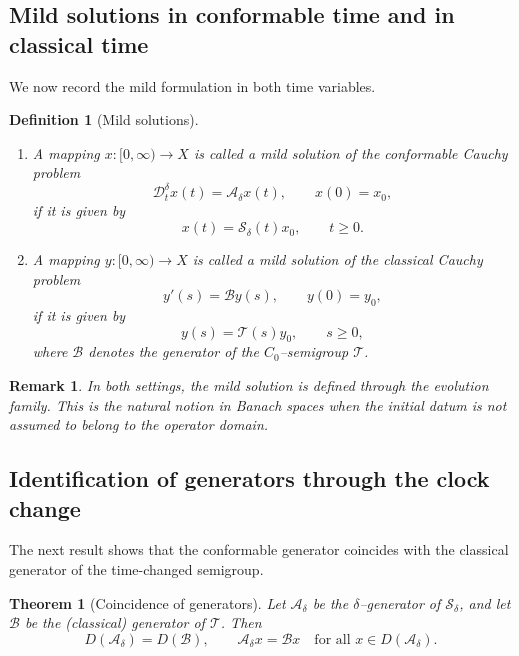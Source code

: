 \documentclass[preprint,12pt]{elsarticle}
\newtheorem{theorem}{Theorem}
\newtheorem{definition}{Definition}
\newtheorem{remark}{Remark}
\begin{document}
\subsection*{Mild solutions in conformable time and in classical time}

We now record the mild formulation in both time variables.

\begin{definition}[Mild solutions]\label{def:mild_combined}
\leavevmode
\begin{enumerate}
\item
A mapping $x:[0,\infty)\to X$ is called a \emph{mild solution} of the conformable
Cauchy problem
\[
\mathcal D_t^\delta x(t)=\mathcal A_\delta x(t),
\qquad x(0)=x_0,
\]
if it is given by
\[
x(t)=\mathcal S_\delta(t)x_0,\qquad t\ge0.
\]

\item
A mapping $y:[0,\infty)\to X$ is called a \emph{mild solution} of the classical
Cauchy problem
\[
y'(s)=\mathcal B y(s),\qquad y(0)=y_0,
\]
if it is given by
\[
y(s)=\mathcal T(s)y_0,\qquad s\ge0,
\]
where $\mathcal B$ denotes the generator of the $C_0$--semigroup $\mathcal T$.
\end{enumerate}
\end{definition}

\begin{remark}\label{rem:mild_general}
In both settings, the mild solution is defined through the evolution family.
This is the natural notion in Banach spaces when the initial datum is not
assumed to belong to the operator domain.
\end{remark}

\subsection*{Identification of generators through the clock change}

The next result shows that the conformable generator coincides with the
classical generator of the time-changed semigroup.

\begin{theorem}[Coincidence of generators]\label{thm:generators_combined}
Let $\mathcal A_\delta$ be the $\delta$--generator of $\mathcal S_\delta$, and let
$\mathcal B$ be the (classical) generator of $\mathcal T$.
Then
\[
D(\mathcal A_\delta)=D(\mathcal B),
\qquad
\mathcal A_\delta x=\mathcal Bx\quad\text{for all }x\in D(\mathcal A_\delta).
\]
\end{theorem}
\end{document}
